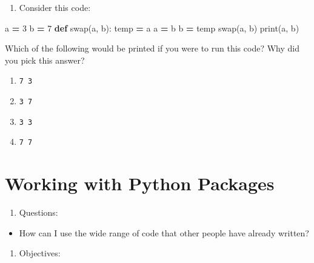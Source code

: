 \documentclass[]{book}
\newenvironment{Shaded}{\begin{snugshade}}{\end{snugshade}}
\newcommand{\BuiltInTok}[1]{#1}
\newcommand{\DecValTok}[1]{\textcolor[rgb]{0.00,0.00,0.81}{#1}}
\newcommand{\KeywordTok}[1]{\textcolor[rgb]{0.13,0.29,0.53}{\textbf{#1}}}
\newcommand{\NormalTok}[1]{#1}
\newcommand{\OperatorTok}[1]{\textcolor[rgb]{0.81,0.36,0.00}{\textbf{#1}}}
\providecommand{\tightlist}{%
  \setlength{\itemsep}{0pt}\setlength{\parskip}{0pt}}
\theoremstyle{definition}
\theoremstyle{definition}
\theoremstyle{definition}
\theoremstyle{remark}
\begin{document}
\begin{enumerate}
\def\labelenumi{\arabic{enumi}.}
\setcounter{enumi}{4}
\tightlist
\item
  Consider this code:
\end{enumerate}

\begin{Shaded}
\begin{Highlighting}[]
\NormalTok{a }\OperatorTok{=} \DecValTok{3}
\NormalTok{b }\OperatorTok{=} \DecValTok{7}
\KeywordTok{def}\NormalTok{ swap(a, b):}
\NormalTok{    temp }\OperatorTok{=}\NormalTok{ a}
\NormalTok{    a }\OperatorTok{=}\NormalTok{ b}
\NormalTok{    b }\OperatorTok{=}\NormalTok{ temp}
\NormalTok{swap(a, b)}
\BuiltInTok{print}\NormalTok{(a, b)}
\end{Highlighting}
\end{Shaded}

Which of the following would be printed if you were to run this code?
Why did you pick this answer?

\begin{enumerate}
\def\labelenumi{\arabic{enumi}.}
\tightlist
\item
  \texttt{7\ 3}
\item
  \texttt{3\ 7}
\item
  \texttt{3\ 3}
\item
  \texttt{7\ 7}
\end{enumerate}

\hypertarget{working-with-python-packages}{%
\chapter{Working with Python
Packages}\label{working-with-python-packages}}

\begin{enumerate}
\def\labelenumi{\arabic{enumi}.}
\tightlist
\item
  Questions:
\end{enumerate}

\begin{itemize}
\tightlist
\item
  How can I use the wide range of code that other people have already
  written?
\end{itemize}

\begin{enumerate}
\def\labelenumi{\arabic{enumi}.}
\setcounter{enumi}{1}
\tightlist
\item
  Objectives:
\end{enumerate}
\end{document}
